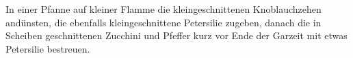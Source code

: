 
      \begin{zubereitung}
        In einer Pfanne auf kleiner Flamme die kleingeschnittenen
	Knoblauchzehen andünsten, die ebenfalls kleingeschnittene Petersilie
	zugeben, danach die in Scheiben geschnittenen Zucchini und Pfeffer
	kurz vor Ende der Garzeit mit etwas Petersilie bestreuen. \\
      \end{zubereitung}
